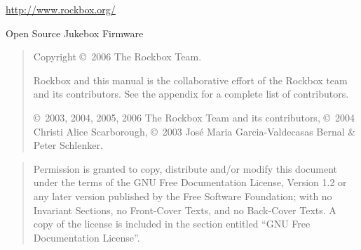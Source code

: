 
\vspace{1cm}
\noindent
\begin{center}
\url{http://www.rockbox.org/}

\noindent
Open Source Jukebox Firmware
\end{center}

\vspace{6cm}
\begin{quote}
  \begin{center}
  Copyright \copyright\ 2006 The Rockbox Team.
  \end{center}
Rockbox and this manual is the collaborative effort of the
Rockbox team and its contributors. See the appendix for a complete list of
contributors.

\copyright\ 2003, 2004, 2005, 2006 The Rockbox Team and its contributors,
\copyright\ 2004 Christi Alice Scarborough,
\copyright\ 2003 Jos\'{e} Maria Garcia-Valdecasas Bernal \& Peter Schlenker.
\end{quote}

\vspace{\fill}
\begin{quote}
  Permission is granted to copy, distribute and/or modify this document
  under the terms of the GNU Free Documentation License, Version 1.2
  or any later version published by the Free Software Foundation;
  with no Invariant Sections, no Front-Cover Texts, and no Back-Cover Texts.
  A copy of the license is included in the section entitled ``GNU
  Free Documentation License''.
\end{quote}


